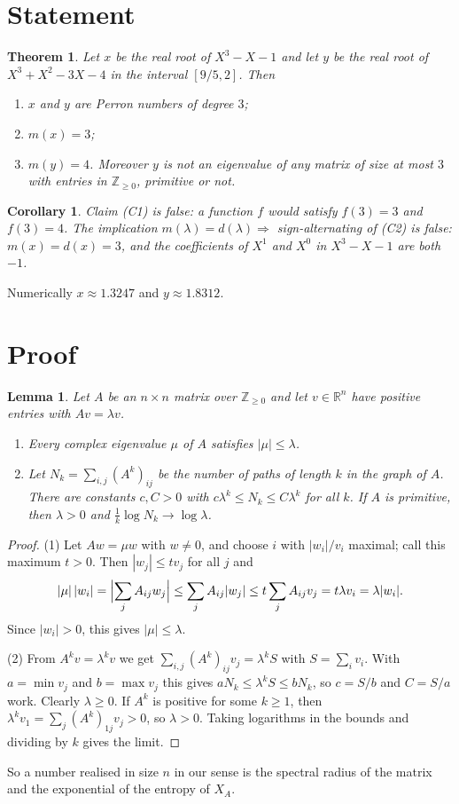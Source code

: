 \documentclass[11pt]{article}
\newtheorem{theorem}{Theorem}
\newtheorem{lemma}{Lemma}
\newtheorem{corollary}{Corollary}
\theoremstyle{remark}
\begin{document}
\section*{Statement}
\begin{theorem}\label{main}
Let $x$ be the real root of $X^3-X-1$ and let $y$ be the real root of
$X^3+X^2-3X-4$ in the interval $[9/5,2]$. Then
\begin{enumerate}
\item $x$ and $y$ are Perron numbers of degree $3$;
\item $m(x)=3$;
\item $m(y)=4$. Moreover $y$ is not an eigenvalue of any matrix of size
at most $3$ with entries in $\mathbb{Z}_{\ge 0}$, primitive or not.
\end{enumerate}
\end{theorem}
\begin{corollary}
Claim \textup{(C1)} is false: a function $f$ would satisfy $f(3)=3$ and
$f(3)=4$. The implication $m(\lambda)=d(\lambda)\Rightarrow$
sign-alternating of \textup{(C2)} is false: $m(x)=d(x)=3$, and the
coefficients of $X^1$ and $X^0$ in $X^3-X-1$ are both $-1$.
\end{corollary}
Numerically $x\approx 1.3247$ and $y\approx 1.8312$.

\section*{Proof}
\begin{lemma}\label{spec}
Let $A$ be an $n\times n$ matrix over $\mathbb{Z}_{\ge 0}$ and let
$v\in\mathbb{R}^n$ have positive entries with $Av=\lambda v$.
\begin{enumerate}
\item Every complex eigenvalue $\mu$ of $A$ satisfies
$|\mu|\le\lambda$.
\item Let $N_k=\sum_{i,j}(A^k)_{ij}$ be the number of paths of length
$k$ in the graph of $A$. There are constants $c,C>0$ with
$c\lambda^k\le N_k\le C\lambda^k$ for all $k$. If $A$ is primitive, then
$\lambda>0$ and $\frac1k\log N_k\to\log\lambda$.
\end{enumerate}
\end{lemma}
\begin{proof}
(1) Let $Aw=\mu w$ with $w\ne 0$, and choose $i$ with $|w_i|/v_i$
maximal; call this maximum $t>0$. Then $|w_j|\le t v_j$ for all $j$ and
\[
 |\mu|\,|w_i|=\Bigl|\sum_j A_{ij}w_j\Bigr|\le\sum_j A_{ij}|w_j|
 \le t\sum_j A_{ij}v_j=t\lambda v_i=\lambda|w_i| .
\]
Since $|w_i|>0$, this gives $|\mu|\le\lambda$.

(2) From $A^kv=\lambda^kv$ we get
$\sum_{i,j}(A^k)_{ij}v_j=\lambda^k S$ with $S=\sum_i v_i$. With
$a=\min v_j$ and $b=\max v_j$ this gives
$aN_k\le\lambda^kS\le bN_k$, so $c=S/b$ and $C=S/a$ work. Clearly
$\lambda\ge 0$. If $A^k$ is positive for some $k\ge1$, then
$\lambda^kv_1=\sum_j(A^k)_{1j}v_j>0$, so $\lambda>0$. Taking logarithms
in the bounds and dividing by $k$ gives the limit.
\end{proof}
So a number realised in size $n$ in our sense is the spectral radius of
the matrix and the exponential of the entropy of $X_A$.
\end{document}
